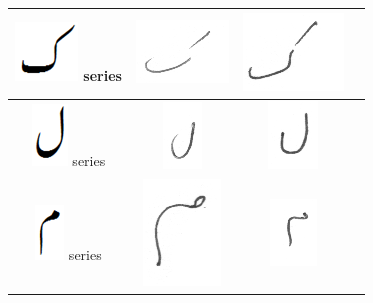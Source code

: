 \documentclass[a4paper,conference]{IEEEtran}
\begin{document}
\begin{table}[h]
\begin{tabular}{@{}cccc@{}}
\hline
\includegraphics[scale=0.15]{kaaf_orig} series & \includegraphics[scale=0.15]{137} & \includegraphics[scale=0.15]{138}  & \\
\hline
\includegraphics[scale=0.15]{Laam_orig} series & \includegraphics[scale=0.15]{139} & \includegraphics[scale=0.15]{140}  &  \\
\hline
\includegraphics[scale=0.15]{meem_orig} series & \includegraphics[scale=0.15]{141} & \includegraphics[scale=0.15]{142}  &  \\

\end{tabular}
\end{table}
\end{document}
